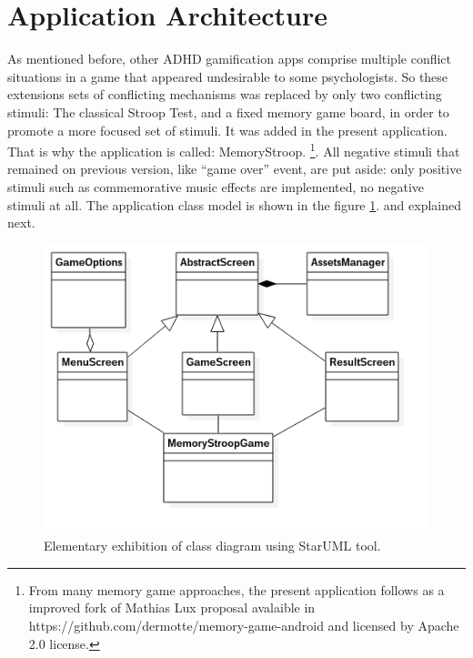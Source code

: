 		
\section{Application Architecture}

As mentioned before, other ADHD gamification apps comprise multiple conflict situations in a game that appeared undesirable to some psychologists. So these extensions sets of conflicting mechanisms was replaced by only two conflicting stimuli: The classical Stroop Test, and a fixed memory game board, in order to promote a more focused set of stimuli. It was added in the present application. That is why the application is called: MemoryStroop. \footnote{From many memory game approaches, the present application follows as a improved fork of Mathias Lux proposal avalaible in https://github.com/dermotte/memory-game-android and licensed by Apache 2.0 license.}.  All negative stimuli that remained on previous version, like ``game over'' event, are put aside: only positive stimuli such as commemorative music effects are implemented, no negative stimuli at all. The application class model is shown in the figure \ref{uml}. and explained next.
		
				\begin{figure}[htp]
					\begin{center}
						\includegraphics[scale=0.65]{chapters/desenvolvimento/img/uml_2.png}
						\caption{Elementary exhibition of class diagram using StarUML tool.}
						\label{uml}
					\end{center}
				\end{figure}
		
